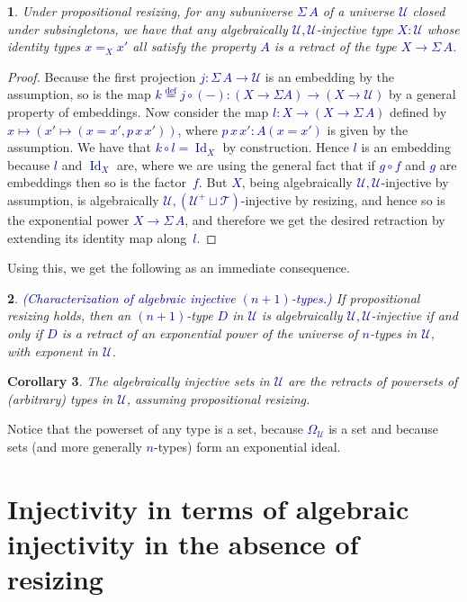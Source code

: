 \documentclass[10pt]{article}
\newcommand{\db}{\textcolor{darkblue}}
\newcommand{\df}[1]{\emph{\db{#1}}}
\newcommand{\m}[1]{\db{$#1$}}
\newcommand{\comp}{\mathrel{\circ}}
\newcommand{\U}{\mathcal{U}}
\newcommand{\T}{\mathcal{T}}
\newcommand{\Id}{\operatorname{Id}}
\newcommand{\eqdef}{\overset{\text{def}}{=}}
\newtheorem{numbered}{}
\newtheorem{corollary}[numbered]{Corollary}
\theoremstyle{definition}
\begin{document}
\begin{numbered}
  Under propositional resizing, for any subuniverse \m{\Sigma \, A} of
  a universe \m{\U} closed under subsingletons, we have that any
  algebraically \m{\U,\U}-injective type \m{X:\U} whose identity types
  \m{x=_X x'} all satisfy the property \m{A} is a retract of
  the type \m{X \to \Sigma \, A}.
\end{numbered}
\begin{proof}
  Because the first projection \m{j : \Sigma \, A \to \U} is an
  embedding by the assumption, so is the map \m{k \eqdef j \comp (-) :
    (X \to \Sigma A) \to (X \to \U)} by a general property of
  embeddings. Now consider the map \m{l : X \to (X \to \Sigma \, A)}
  defined by \m{x \mapsto (x' \mapsto (x=x', p \, x \, x'))}, where
  \m{p \, x \, x' : A(x=x')} is given by the assumption. We have that
  \m{k \comp l = \Id_X} by construction. Hence \m{l} is an embedding
  because \m{l} and \m{\Id_X} are, where we are using the general fact
  that if \m{g \comp f} and \m{g} are embeddings then so is the
  factor~\m{f}.  But \m{X}, being algebraically \m{\U,\U}-injective by
  assumption, is algebraically \m{\U,(\U^+ \sqcup \T)}-injective by
  resizing, and hence so is the exponential power \m{X \to \Sigma \,
    A}, and therefore we get the desired retraction by extending its
  identity map along~\m{l}.
\end{proof}

Using this, we get the following as an immediate consequence.

\begin{numbered} \df{(Characterization of algebraic injective \m{(n+1)}-types.)}  If propositional resizing holds, then an
  \m{(n+1)}-type \m{D} in \m{\U} is algebraically \m{\U,\U}-injective
  if and only if \m{D} is a retract of an exponential power of the
  universe of \m{n}-types in \m{\U}, with exponent in \m{\U}.
\end{numbered}

\begin{corollary}
  The algebraically injective sets in \m{\U} are the retracts of
  powersets of (arbitrary) types in \m{\U}, assuming propositional resizing.
\end{corollary}
\noindent Notice that the powerset of any type is a set, because
\m{\Omega_\U} is a set and because sets (and more generally
\m{n}-types) form an exponential ideal.



\section{Injectivity in terms of algebraic injectivity in the absence of resizing}
\end{document}
